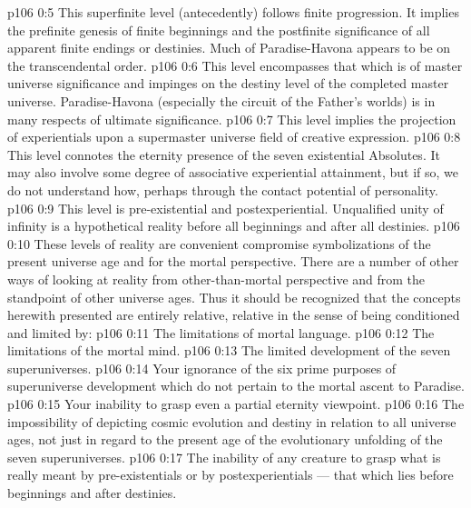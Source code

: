 \vs p106 0:5 \bibnobreakspace {} This superfinite level (antecedently) follows finite progression. It implies the prefinite genesis of finite beginnings and the postfinite significance of all apparent finite endings or destinies. Much of Paradise\hyp{}Havona appears to be on the transcendental order.
\vs p106 0:6 \bibnobreakspace {} This level encompasses that which is of master universe significance and impinges on the destiny level of the completed master universe. Paradise\hyp{}Havona (especially the circuit of the Father’s worlds) is in many respects of ultimate significance.
\vs p106 0:7 \bibnobreakspace {} This level implies the projection of experientials upon a supermaster universe field of creative expression.
\vs p106 0:8 \bibnobreakspace {} This level connotes the eternity presence of the seven existential Absolutes. It may also involve some degree of associative experiential attainment, but if so, we do not understand how, perhaps through the contact potential of personality.
\vs p106 0:9 \bibnobreakspace {} This level is pre\hyp{}existential and postexperiential. Unqualified unity of infinity is a hypothetical reality before all beginnings and after all destinies.
\vs p106 0:10 \pc These levels of reality are convenient compromise symbolizations of the present universe age and for the mortal perspective. There are a number of other ways of looking at reality from other\hyp{}than\hyp{}mortal perspective and from the standpoint of other universe ages. Thus it should be recognized that the concepts herewith presented are entirely relative, relative in the sense of being conditioned and limited by:
\vs p106 0:11 \bibnobreakspace The limitations of mortal language.
\vs p106 0:12 \bibnobreakspace The limitations of the mortal mind.
\vs p106 0:13 \bibnobreakspace The limited development of the seven superuniverses.
\vs p106 0:14 \bibnobreakspace Your ignorance of the six prime purposes of superuniverse development which do not pertain to the mortal ascent to Paradise.
\vs p106 0:15 \bibnobreakspace Your inability to grasp even a partial eternity viewpoint.
\vs p106 0:16 \bibnobreakspace The impossibility of depicting cosmic evolution and destiny in relation to all universe ages, not just in regard to the present age of the evolutionary unfolding of the seven superuniverses.
\vs p106 0:17 \bibnobreakspace The inability of any creature to grasp what is really meant by pre\hyp{}existentials or by postexperientials --- that which lies before beginnings and after destinies.
